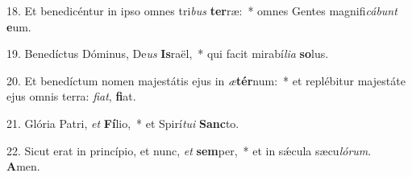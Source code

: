 18. Et benedicéntur in ipso omnes tri\textit{bus} \textbf{ter}ræ:~*  omnes Gentes magnifi\textit{cá}\textit{bunt} \textbf{e}um.\

19. Benedíctus Dóminus, De\textit{us} \textbf{Is}raël,~*  qui facit mirabí\textit{li}\textit{a} \textbf{so}lus.\

20. Et benedíctum nomen majestátis ejus in \textit{æ}\textbf{tér}num:~*  et replébitur majestáte ejus omnis terra: \textit{fi}\textit{at}, \textbf{fi}at.\

21. Glória Patri, \textit{et} \textbf{Fí}lio,~*  et Spirí\textit{tu}\textit{i} \textbf{Sanc}to.\

22. Sicut erat in princípio, et nunc, \textit{et} \textbf{sem}per,~*  et in sǽcula sæcu\textit{ló}\textit{rum}. \textbf{A}men.\

